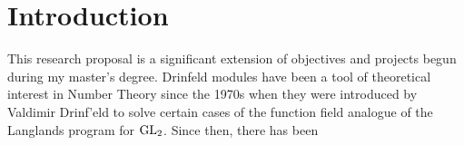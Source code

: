 
\chapter{Introduction} \label{ch-1}

This research proposal is a significant extension of objectives and projects begun during my master's degree. Drinfeld modules have been a tool of theoretical interest in Number Theory since the 1970s when they were introduced by Valdimir Drinf'eld to solve certain cases of the function field analogue of the Langlands program for $\textnormal{GL}_2$. Since then, there has been    


